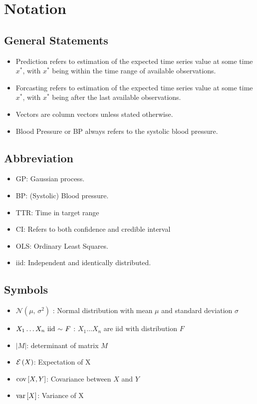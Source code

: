 \chapter*{Notation}
\label{c:Notation}

\section*{General Statements}

\begin{itemize}[label={},leftmargin=*]
  \item Prediction refers to estimation of the expected time series value at some time
  $x^{\ast}$, with $x^{\ast}$ being within the time range of available observations.
  \item Forcasting refers to estimation of the expected time series value at some time
  $x^{\ast}$, with $x^{\ast}$ being after the last available observations.
  \item Vectors are column vectors unless stated otherwise.
  \item Blood Pressure or BP always refers to the systolic blood pressure.
\end{itemize}


\section*{Abbreviation}\label{sec:abbreviation}
\begin{itemize}[label={},leftmargin=*]
  \item GP: Gaussian process.
  \item BP: (Systolic) Blood pressure.
  \item TTR: Time in target range
  \item CI: Refers to both confidence and credible interval
  \item OLS: Ordinary Least Squares.
  \item iid: Independent and identically distributed.

\end{itemize}

\section*{Symbols}\label{sec:symbols}
\begin{itemize}[label={},leftmargin=*]
  \item $\mathcal{N}(\mu,\,\sigma^{2})$ : Normal distribution with mean $\mu$ and standard deviation $\sigma$
  \item $X_1 \dots X_n \text{ iid }{\sim} \text{ } F$ : $X_1 \dots X_n$ are iid with distribution $F$
  \item $|M|$: determinant of matrix $M$
  \item $\ERW{X}$: Expectation of X
  \item $\COV{X,Y}$: Covariance between $X$ and $Y$
  \item $\VAR{X}$: Variance of X
\end{itemize}


